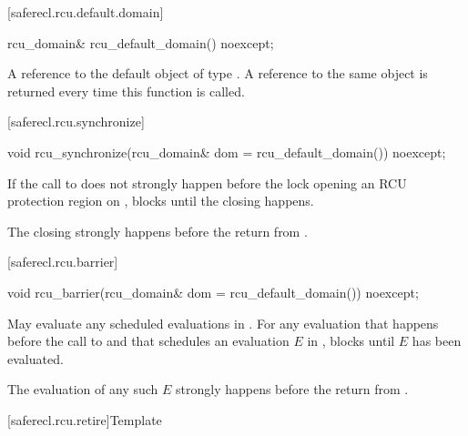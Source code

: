 [saferecl.rcu.default.domain]{}

\begin{itemdecl}
rcu_domain& rcu_default_domain() noexcept;
\end{itemdecl}

\begin{itemdescr}

\returns
A reference to the default object of type .
A reference to the same object is returned every time this
function is called.

\end{itemdescr}

[saferecl.rcu.synchronize]{}

\begin{itemdecl}
void rcu_synchronize(rcu_domain& dom = rcu_default_domain()) noexcept;
\end{itemdecl}

\begin{itemdescr}

\effects
If the call to  does not strongly
happen before the lock opening an RCU protection region 
on , blocks until the  closing 
happens.

\sync
The  closing  strongly
happens before the return from .

\end{itemdescr}

[saferecl.rcu.barrier]{}

\begin{itemdecl}
void rcu_barrier(rcu_domain& dom = rcu_default_domain()) noexcept;
\end{itemdecl}

\begin{itemdescr}

\effects
May evaluate any scheduled evaluations in
. For any evaluation that happens before the call
to  and that schedules an evaluation $E$
in , blocks until $E$ has been evaluated.

\sync
The evaluation of any such $E$ strongly
happens before the return from .

\end{itemdescr}

[saferecl.rcu.retire]{Template }

